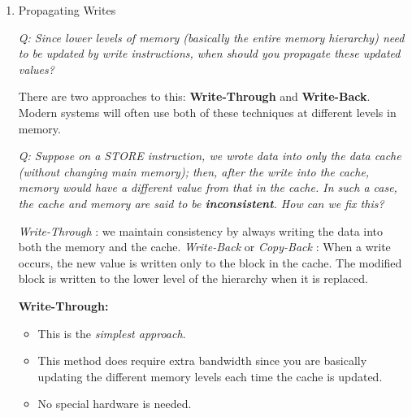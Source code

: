 \documentclass[12pt]{article}
\newenvironment{QandA}{\begin{enumerate}[label=\bfseries\arabic*.]\bfseries}
                      {\end{enumerate}}
\newenvironment{answered}{\par\quad\normalfont}{}
\begin{document}
\begin{QandA}
\begin{answered}
\quad We cannot \textbf{read tag} and \textbf{write data} in parallel because if you happen to write the wrong data - you've made a permanent change and it is hard to recover from this. Therefore, with \textit{write} operations, this is a \textbf{two-step} process where:
\begin{itemize}
    \item You first match the tag
    \item Then write to the matching \textit{way} 
\end{itemize}
This could introduce structural hazards and will require bypassing to avoid unnecessary stalls.
\end{answered}

\item Propagating Writes
\begin{answered}
\textit{Q: Since lower levels of memory (basically the entire memory hierarchy) need to be updated by write instructions, when should you propagate these updated values?}

\quad There are two approaches to this: \textbf{Write-Through} and \textbf{Write-Back}. Modern systems will often use both of these techniques at different levels in memory. 

\quad \textit{Q: Suppose on a STORE instruction, we wrote data into only the data cache (without changing main memory); then, after the write into the cache, memory would have a different value from that in the cache. In such a case, the cache and memory are said to be \textbf{inconsistent}. How can we fix this?}

\quad \textit{Write-Through} : we maintain consistency by always writing the data into both the memory and the cache. \textit{Write-Back} or \textit{Copy-Back} : When a write occurs, the new value is written only to the block in the cache. The modified block is written to the lower level of the hierarchy when it is replaced. 

\textbf{Write-Through:}
\begin{itemize}
    \item This is the \textit{simplest approach}.
    \item This method does require extra bandwidth since you are basically updating the different memory levels each time the cache is updated.
    \item No special hardware is needed.
\end{itemize}


\end{answered}
\end{QandA}
\end{document}
